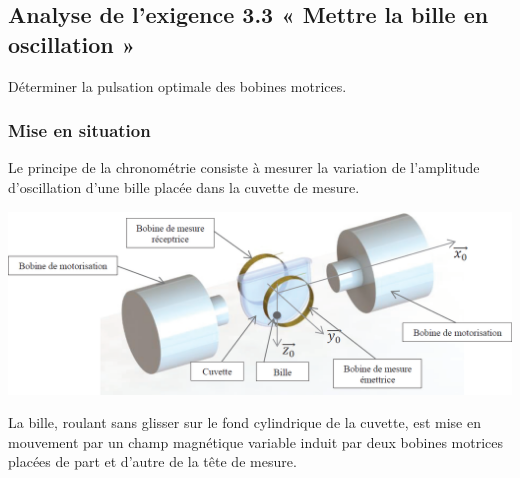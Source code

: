 \documentclass[10pt,fleqn]{article} %
\begin{document}
\begin{multicols}{2}
%

\subsection*{Analyse de l’exigence 3.3 « Mettre la bille en oscillation »}
\begin{obj}
Déterminer la pulsation optimale des bobines motrices.
\end{obj}

\subsubsection*{Mise en situation}
Le principe de la chronométrie consiste à mesurer la variation de l’amplitude d’oscillation d’une
bille placée dans la cuvette de mesure.

\begin{center}
\includegraphics[width=\linewidth]{images/ccp_04}
\end{center}

La bille, roulant sans glisser sur le fond cylindrique de la cuvette, est mise en mouvement par un
champ magnétique variable induit par deux bobines motrices placées de part et d’autre de la tête de
mesure.


\end{multicols}
\end{document}
